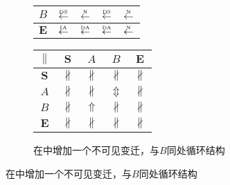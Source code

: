 \begin{figure}[htbp]
\begin{subfigure}{1\textwidth}
\begin{minipage}[b]{0.3\textwidth}
\begin{tabular}{|c|c|c|c|c|}
        $B$ & $\overset{\text{\tiny{DS}}}{\leftarrow}$ & $\overset{\text{\tiny{N}}}{\leftarrow}$ & $\overset{\text{\tiny{DS}}}{\leftarrow}$ & $\overset{\text{\tiny{N}}}{\leftarrow}$\\ \hline
        $\bm{E}$ & $\overset{\text{\tiny{IA}}}{\leftarrow}$ & $\overset{\text{\tiny{DA}}}{\leftarrow}$ & $\overset{\text{\tiny{DA}}}{\leftarrow}$ & $\overset{\text{\tiny{N}}}{\leftarrow}$\\ \hline
      \end{tabular}
    \end{minipage}
    \begin{minipage}[b]{0.3\textwidth}
      \vspace{1em}
      \centering
      \begin{tabular}{|c|c|c|c|c|} \hline
        $\parallel$ & $\bm{S}$ & $A$ & $B$ & $\bm{E}$\\ \hline
        $\bm{S}$ & $\nparallel$ & $\nparallel$ & $\nparallel$ & $\nparallel$\\ \hline
        $A$ & $\nparallel$ & $\nparallel$ & $\Updownarrow$ & $\nparallel$\\ \hline
        $B$ & $\nparallel$ & $\Uparrow$ & $\nparallel$ & $\nparallel$\\ \hline
        $\bm{E}$ & $\nparallel$ & $\nparallel$ & $\nparallel$ & $\nparallel$\\ \hline
      \end{tabular}
    \end{minipage}
    \caption{在中增加一个不可见变迁，与$B$同处循环结构}
    \label{fig:uniqueness_3_h}
  \end{subfigure}


\end{figure}
